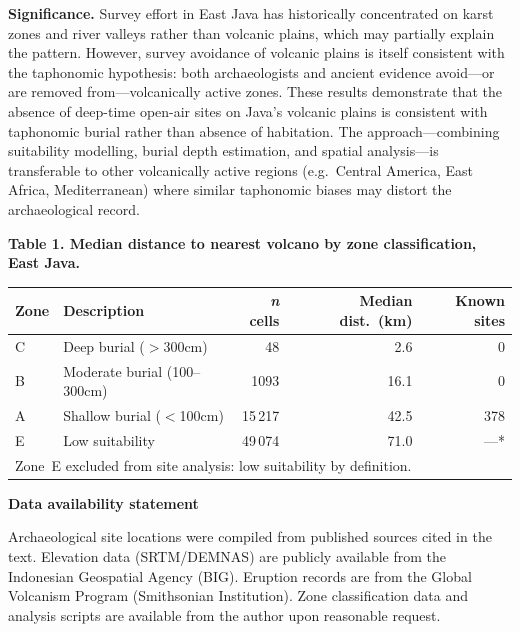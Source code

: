 \documentclass[12pt]{article}
\begin{document}
\textbf{Significance.}
Survey effort in East Java has historically concentrated on karst zones and river valleys rather than volcanic plains, which may partially explain the pattern.
However, survey avoidance of volcanic plains is itself consistent with the taphonomic hypothesis: both archaeologists and ancient evidence avoid---or are removed from---volcanically active zones.
These results demonstrate that the absence of deep-time open-air sites on Java's volcanic plains is consistent with taphonomic burial rather than absence of habitation.
The approach---combining suitability modelling, burial depth estimation, and spatial analysis---is transferable to other volcanically active regions (e.g.\ Central America, East Africa, Mediterranean) where similar taphonomic biases may distort the archaeological record.

\vspace{12pt}

\textbf{Table 1. Median distance to nearest volcano by zone classification, East Java.}

\vspace{6pt}

\begin{tabular}{llrrr}
\hline
Zone & Description & \textit{n} cells & Median dist.\ (km) & Known sites \\
\hline
C & Deep burial ($>$300cm) & 48 & 2.6 & 0 \\
B & Moderate burial (100--300cm) & 1093 & 16.1 & 0 \\
A & Shallow burial ($<$100cm) & 15\,217 & 42.5 & 378 \\
E & Low suitability & 49\,074 & 71.0 & ---* \\
\hline
\multicolumn{5}{l}{\footnotesize *Zone~E excluded from site analysis: low suitability by definition.}
\end{tabular}

\vspace{12pt}

\textbf{Data availability statement}

Archaeological site locations were compiled from published sources cited in the text. Elevation data (SRTM/DEMNAS) are publicly available from the Indonesian Geospatial Agency (BIG). Eruption records are from the Global Volcanism Program (Smithsonian Institution). Zone classification data and analysis scripts are available from the author upon reasonable request.

\vspace{6pt}
\end{document}
